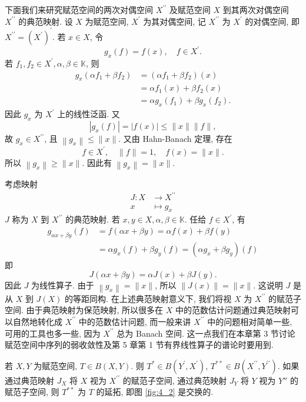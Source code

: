 \documentclass[openany]{ctexbook}
\theoremstyle{kaiti}
\theoremstyle{normal}
\begin{document}
下面我们来研究赋范空间的两次对偶空间 $X^{\prime \prime}$ 及赋范空间 $X$ 到其两次对偶空间 $X^{\prime \prime}$ 的典范映射. 设 $X$ 为赋范空间, $X^{\prime}$ 为其对偶空间, 记 $X^{\prime \prime}$ 为 $X^{\prime}$ 的对偶空间, 即 $X^{\prime \prime}=\left(X^{\prime}\right)^{\prime}$. 若 $x \in X$, 令
$$
g_{x}(f)=f(x), \quad f \in X^{\prime}.
$$
若 $f_1, f_2 \in X^{\prime}, \alpha, \beta \in \mathbb{K}$, 则
$$
\begin{aligned}
g_{x}\left(\alpha f_1+\beta f_2\right) &=\left(\alpha f_1+\beta f_2\right)(x) \\
&=\alpha f_1(x)+\beta f_2(x) \\
&=\alpha g_{x}\left(f_1\right)+\beta g_{x}\left(f_2\right).
\end{aligned}
$$
因此 $g_{x}$ 为 $X^{\prime}$ 上的线性泛函. 又
$$
\left|g_{x}(f)\right|=|f(x)| \leqslant\|x\|\|f\|,
$$
故 $g_{x} \in X^{\prime \prime}$, 且 $\left\|g_{x}\right\| \leqslant\|x\|$. 又由 Hahn-Banach 定理, 存在
$$
f \in X^{\prime}, \quad\|f\|=1, \quad f(x)=\|x\|.
$$
所以 $\left\|g_{x}\right\| \geqslant\|x\|$. 因此有 $\left\|g_{x}\right\|=\|x\|$.

考虑映射
$$
\begin{aligned}
J: X & \rightarrow X^{\prime \prime} \\
x & \longmapsto g_{x}
\end{aligned}
$$
$J$ 称为 $X$ 到 $X^{\prime \prime}$ 的典范映射. 若 $x, y \in X, \alpha, \beta \in \mathbb{K}$. 任给 $f \in X^{\prime}$, 有
$$
\begin{aligned}
g_{\alpha x+\beta y}(f) &=f(\alpha x+\beta y)=\alpha f(x)+\beta f(y) \\
&=\alpha g_{x}(f)+\beta g_{y}(f)=\left(\alpha g_{x}+\beta g_{y}\right)(f)
\end{aligned}
$$
即
$$
J(\alpha x+\beta y)=\alpha J(x)+\beta J(y).
$$
因此 $J$ 为线性算子. 由于 $\left\|g_{x}\right\|=\|x\|$, 所以 $\|J(x)\|=\|x\|$. 这说明 $J$ 是从 $X$ 到 $J(X)$ 的等距同构. 在上述典范映射意义下, 我们将视 $X$ 为 $X^{\prime \prime}$ 的赋范子空间. 由于典范映射为保范映射, 所以很多在 $X$ 中的范数估计问题通过典范映射可以自然地转化成 $X^{\prime \prime}$ 中的范数估计问题, 而一般来讲 $X^{\prime \prime}$ 中的问题相对简单一些, 可用的工具也多一些, 因为 $X^{\prime \prime}$ 总为 Banach 空间. 这一点我们在本章第 3 节讨论赋范空间中序列的弱收敛性及第 5 章第 1 节有界线性算子的谱论时要用到.

若 $X, Y$ 为赋范空间, $T \in B(X, Y)$. 则 $T^{*} \in B\left(Y^{\prime}, X^{\prime}\right)$, $T^{**} \in B\left(X^{\prime \prime}, Y^{\prime \prime}\right)$. 如果通过典范映射 $J_{X}$ 将 $X$ 视为 $X^{\prime \prime}$ 的赋范子空间, 通过典范映射 $J_{Y}$ 将 $Y$ 视为 $Y''$ 的赋范子空间, 则 $T^{**}$ 为 $T$ 的延拓, 即图 \ref{fig:4_2} 是交换的.
\end{document}
